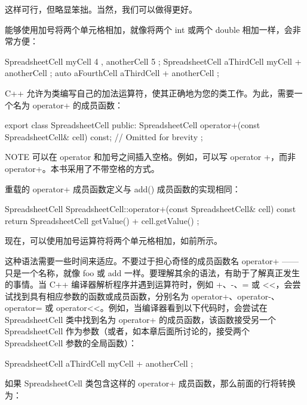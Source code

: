 这样可行，但略显笨拙。当然，我们可以做得更好。


能够使用加号将两个单元格相加，就像将两个 int 或两个 double 相加一样，会非常方便：

\begin{cpp}
SpreadsheetCell myCell { 4 }, anotherCell { 5 };
SpreadsheetCell aThirdCell { myCell + anotherCell };
auto aFourthCell { aThirdCell + anotherCell };
\end{cpp}

C++ 允许为类编写自己的加法运算符，使其正确地为您的类工作。为此，需要一个名为 operator+ 的成员函数：

\begin{cpp}
export class SpreadsheetCell
{
    public:
        SpreadsheetCell operator+(const SpreadsheetCell& cell) const;
        // Omitted for brevity
};
\end{cpp}

\begin{myNotic}{NOTE}
可以在 operator 和加号之间插入空格。例如，可以写 operator +，而非 operator+。本书采用了不带空格的方式。
\end{myNotic}

重载的 operator+ 成员函数定义与 add() 成员函数的实现相同：

\begin{cpp}
SpreadsheetCell SpreadsheetCell::operator+(const SpreadsheetCell& cell) const
{
    return SpreadsheetCell { getValue() + cell.getValue() };
}
\end{cpp}

现在，可以使用加号运算符将两个单元格相加，如前所示。

这种语法需要一些时间来适应。不要过于担心奇怪的成员函数名 operator+ ——只是一个名称，就像 foo 或 add 一样。要理解其余的语法，有助于了解真正发生的事情。当 C++ 编译器解析程序并遇到运算符时，例如 +、-、= 或 <{}<，会尝试找到具有相应参数的函数或成员函数，分别名为 operator+、operator-、operator= 或 operator<{}<。例如，当编译器看到以下代码时，会尝试在 SpreadsheetCell 类中找到名为 operator+ 的成员函数，该函数接受另一个 SpreadsheetCell 作为参数（或者，如本章后面所讨论的，接受两个 SpreadsheetCell 参数的全局函数）：

\begin{cpp}
SpreadsheetCell aThirdCell { myCell + anotherCell };
\end{cpp}

如果 SpreadsheetCell 类包含这样的 operator+ 成员函数，那么前面的行将转换为：

